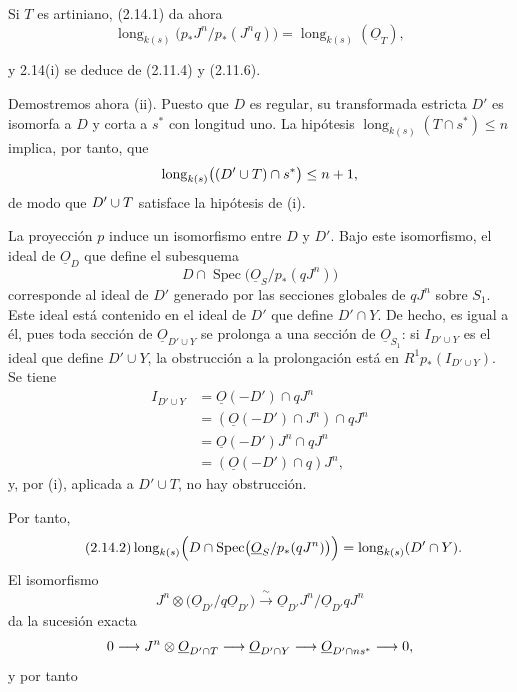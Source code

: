 Si $T$ es artiniano, (2.14.1) da ahora
\begin{equation*}
\operatorname{long}_{k(s)}
\bigl(p_*J^n/p_*(J^nq)\bigr)
=\operatorname{long}_{k(s)}(\underline{O}_T),
\end{equation*}

\pageoriginale

y 2.14(i) se deduce de (2.11.4) y (2.11.6).

Demostremos ahora (ii). Puesto que $D$ es regular, su transformada estricta
$D'$ es isomorfa a $D$ y corta a $s^*$ con longitud uno. La hipótesis
$\operatorname{long}_{k(s)}(T\cap s^*)\leq n$ implica, por tanto, que
\begin{equation*}
\operatorname{long}_{k(s)}
\bigl((D'\cup T)\cap s^*\bigr)\leq n+1,
\end{equation*}
de modo que $D'\cup T$ satisface la hipótesis de (i).

La proyección $p$ induce un isomorfismo entre $D$ y $D'$. Bajo este isomorfismo,
el ideal de $\underline{O}_D$ que define el subesquema
\begin{equation*}
D\cap\operatorname{Spec}\bigl(\underline{O}_S/p_*(qJ^n)\bigr)
\end{equation*}
corresponde al ideal de $D'$ generado por las secciones globales de $qJ^n$ sobre
$S_1$. Este ideal está contenido en el ideal de $D'$ que define $D'\cap Y$. De
hecho, es igual a él, pues toda sección de
$\underline{O}_{D'\cup Y}$ se prolonga a una sección de $\underline{O}_{S_1}$:
si $I_{D'\cup Y}$ es el ideal que define $D'\cup Y$, la obstrucción a la
prolongación está en $R^1p_*(I_{D'\cup Y})$. Se tiene
\begin{equation*}
\begin{aligned}
I_{D'\cup Y}
&=\underline{O}(-D')\cap qJ^n\\
&=(\underline{O}(-D')\cap J^n)\cap qJ^n\\
&=\underline{O}(-D')J^n\cap qJ^n\\
&=(\underline{O}(-D')\cap q)J^n,
\end{aligned}
\end{equation*}
y, por (i), aplicada a $D'\cup T$, no hay obstrucción.

Por tanto,
\begin{equation}\tag{2.14.2}
\operatorname{long}_{k(s)}
\Bigl(D\cap\operatorname{Spec}\bigl(\underline{O}_S/p_*(qJ^n)\bigr)\Bigr)
=\operatorname{long}_{k(s)}(D'\cap Y).
\end{equation}
El isomorfismo
\begin{equation*}
J^n\otimes
\bigl(\underline{O}_{D'}/q\underline{O}_{D'}\bigr)
\xrightarrow{\;\sim\;}
\underline{O}_{D'}J^n/\underline{O}_{D'}qJ^n
\end{equation*}
da la sucesión exacta
\begin{equation*}
0\longrightarrow
J^n\sisi{\otimes_{D'\cap T}}{\otimes\underline{O}_{D'\cap T}}
\longrightarrow\underline{O}_{D'\cap Y}
\longrightarrow\underline{O}_{D'\cap ns^*}
\longrightarrow0,
\end{equation*}
y por tanto

